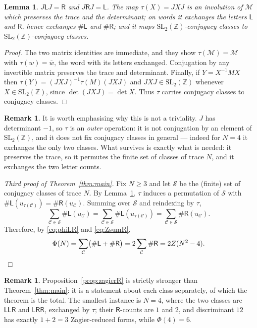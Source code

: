 \documentclass[11pt,reqno]{amsart}
\theoremstyle{plain}
\newtheorem{lemma}[theorem]{Lemma}
\theoremstyle{definition}
\newtheorem{remark}[theorem]{Remark}
\newcommand{\Z}{\mathbb{Z}}
\newcommand{\Ll}{\mathsf{L}}
\newcommand{\Rr}{\mathsf{R}}
\newcommand{\Mon}{\mathcal{M}}
\newcommand{\SL}{\mathrm{SL}}
\begin{document}
\begin{lemma}\label{lem:swap}
$J\Ll J=\Rr$ and $J\Rr J=\Ll$. The map $\tau(X)=JXJ$ is an involution of $\Mon$ which
preserves the trace and the determinant; on words it exchanges the letters $\Ll$ and
$\Rr$, hence exchanges $\#\Ll$ and $\#\Rr$; and it maps $\SL_2(\Z)$-conjugacy classes to
$\SL_2(\Z)$-conjugacy classes.
\end{lemma}

\begin{proof}
The two matrix identities are immediate, and they show $\tau(\Mon)=\Mon$ with
$\tau(w)=\bar w$, the word with its letters exchanged. Conjugation by any invertible
matrix preserves the trace and determinant. Finally, if $Y=X^{-1}MX$ then
$\tau(Y)=(JXJ)^{-1}\tau(M)(JXJ)$ and $JXJ\in\SL_2(\Z)$ whenever $X\in\SL_2(\Z)$, since
$\det(JXJ)=\det X$. Thus $\tau$ carries conjugacy classes to conjugacy classes.
\end{proof}

\begin{remark}
It is worth emphasising why this is not a triviality. $J$ has determinant $-1$, so
$\tau$ is an \emph{outer} operation: it is not conjugation by an element of
$\SL_2(\Z)$, and it does not fix conjugacy classes in general --- indeed for $N=4$ it
exchanges the only two classes. What survives is exactly what is needed: it preserves
the trace, so it permutes the finite set of classes of trace $N$, and it exchanges the
two letter counts.
\end{remark}

\begin{proof}[Third proof of Theorem~\ref{thm:main}]
Fix $N\ge3$ and let $\mathcal{S}$ be the (finite) set of conjugacy classes of trace $N$.
By Lemma~\ref{lem:swap}, $\tau$ induces a permutation of $\mathcal{S}$ with
$\#\Ll(u_{\tau(\mathcal{C})})=\#\Rr(u_{\mathcal{C}})$. Summing over $\mathcal{S}$ and
reindexing by $\tau$,
\[
  \sum_{\mathcal{C}\in\mathcal{S}}\#\Ll(u_\mathcal{C})
  =\sum_{\mathcal{C}\in\mathcal{S}}\#\Ll(u_{\tau(\mathcal{C})})
  =\sum_{\mathcal{C}\in\mathcal{S}}\#\Rr(u_\mathcal{C}).
\]
Therefore, by \eqref{eq:phiLR} and \eqref{eq:ZsumR},
\[
  \Phi(N)=\sum_{\mathcal C}\bigl(\#\Ll+\#\Rr\bigr)
        =2\sum_{\mathcal C}\#\Rr
        =2Z(N^2-4). \qedhere
\]
\end{proof}

\begin{remark}
Proposition~\ref{prop:zagierR} is strictly stronger than Theorem~\ref{thm:main}: it is a
statement about each class separately, of which the theorem is the total. The smallest
instance is $N=4$, where the two classes are $\Ll\Ll\Rr$ and $\Ll\Rr\Rr$, exchanged by
$\tau$; their $\Rr$-counts are $1$ and $2$, and discriminant $12$ has exactly
$1+2=3$ Zagier-reduced forms, while $\Phi(4)=6$.
\end{remark}
\end{document}
